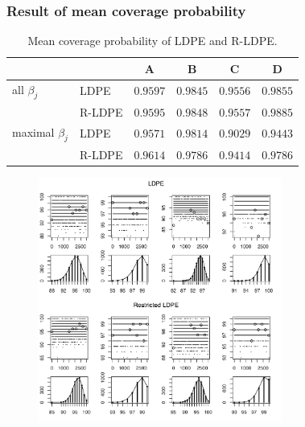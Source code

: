 \begin{frame}
\frametitle{Result of mean coverage probability}

\begin{table}[ht]
\caption{Mean coverage probability of LDPE and R-LDPE.}
\begin{tabular}{llcccc}
\toprule
&&A&B&C&D\\
\midrule
all $\beta_j$& LDPE & $0.9597$ & $0.9845$ & $0.9556$ & $0.9855$ \\
 &R-LDPE & $0.9595$ & $0.9848$ & $0.9557$ & $0.9885$  \\ [1ex]
 maximal $\beta_j$ & LDPE&  $0.9571$ & $0.9814$& $0.9029$ &$0.9443$\\
& R-LDPE & $0.9614$ & $0.9786$ & $0.9414$ & $0.9786$\\
\bottomrule
\end{tabular}

\label{table:meancover}
\end{table}
\end{frame}


\begin{frame}
\begin{centering}
\begin{figure}[p]
\includegraphics[width = 8cm]{1110/coverage.pdf}
\label{fig:cover}
\end{figure}
\end{centering}

\end{frame}

